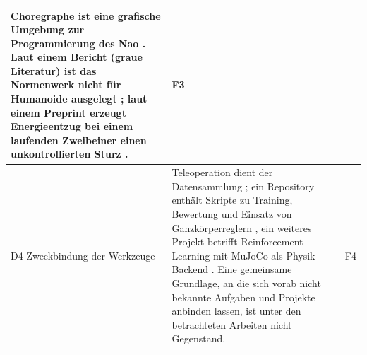 \begin{table}[htbp]
\begin{tabularx}{\textwidth}{|P{2.6cm}|L|P{1.3cm}|}
        Choregraphe ist eine grafische Umgebung zur Programmierung des Nao \cite{Pot2009}.
        Laut einem Bericht (graue Literatur) ist das Normenwerk nicht für Humanoide ausgelegt \cite{Prather2025}; laut einem Preprint erzeugt Energieentzug bei einem laufenden Zweibeiner einen unkontrollierten Sturz \cite{Ding2026}. &
        F3\\\hline
        D4 Zweckbindung der Werkzeuge &
        Teleoperation dient der Datensammlung \cite{Cheng2024}; ein Repository enthält Skripte zu Training, Bewertung und Einsatz von Ganzkörperreglern \cite{NvidiaGR00TWBC}, ein weiteres Projekt betrifft Reinforcement Learning mit MuJoCo als Physik-Backend \cite{UnitreeRLMjlab}.
        Eine gemeinsame Grundlage, an die sich vorab nicht bekannte Aufgaben und Projekte anbinden lassen, ist unter den betrachteten Arbeiten nicht Gegenstand. &
        F4\\\hline
    \end{tabularx}
\end{table}


